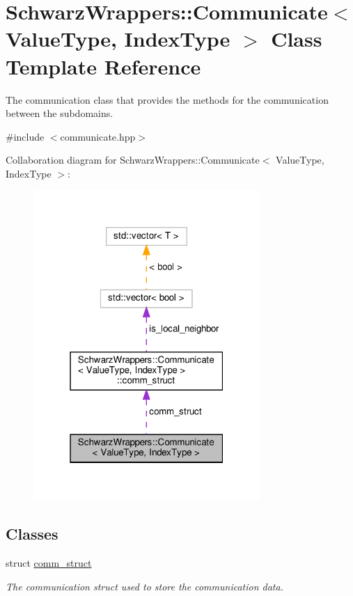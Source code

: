 \hypertarget{classSchwarzWrappers_1_1Communicate}{}\section{Schwarz\+Wrappers\+:\+:Communicate$<$ Value\+Type, Index\+Type $>$ Class Template Reference}
\label{classSchwarzWrappers_1_1Communicate}


The communication class that provides the methods for the communication between the subdomains.  




{\ttfamily \#include $<$communicate.\+hpp$>$}



Collaboration diagram for Schwarz\+Wrappers\+:\+:Communicate$<$ Value\+Type, Index\+Type $>$\+:
\nopagebreak
\begin{figure}[H]
\begin{center}
\leavevmode
\includegraphics[width=244pt]{classSchwarzWrappers_1_1Communicate__coll__graph}
\end{center}
\end{figure}
\subsection*{Classes}
\begin{DoxyCompactItemize}
\item 
struct \hyperlink{structSchwarzWrappers_1_1Communicate_1_1comm__struct}{comm\+\_\+struct}
\begin{DoxyCompactList}\small\item\em The communication struct used to store the communication data. \end{DoxyCompactList}\end{DoxyCompactItemize}
